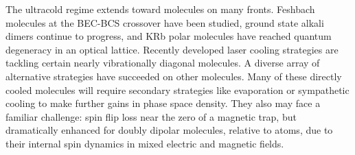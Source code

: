 \documentclass[%
 reprint,
 amsmath,amssymb,
 aps,
prl,
]{revtex4-1}
\newcommand{\s}{{\nobreak\hspace{.2em}}}
\begin{document}
The ultracold regime extends toward molecules on many fronts\s\cite{Carr2009}.
Feshbach molecules at the BEC-BCS crossover have been studied\s\cite{Greiner2003, Zwierlein2003, Jochim2003}, ground state alkali dimers continue to progress\s\cite{Ni2008, Danzl2010, Takekoshi2014, Molony2014, Park2015, Guo2016, Drews2017, Liu2017, Rvachov2017},
and KRb polar molecules have reached quantum degeneracy in an optical lattice\s\cite{Moses2015}.
Recently developed laser cooling strategies are tackling certain nearly vibrationally diagonal molecules\s\cite{Stuhl2008, Hummon2013, Barry2014, Zhelyazkova2014, Hemmerling2016, Truppe2017}.
A diverse array of alternative strategies have succeeded on other molecules\s\cite{Weinstein1998, Bethlem1999, Bochinski2003, Narevicius2008, Sawyer2011, Wiederkehr2012, Prehn2016, Liu2017a, Wu2017}.
Many of these directly cooled molecules will require secondary strategies like evaporation or sympathetic cooling to make further gains in phase space density\s\cite{Parazzoli2011, Stuhl2012evap, Quemener2016}.
They also may face a familiar challenge: spin flip loss near the zero of a magnetic trap, but dramatically enhanced for doubly dipolar molecules, relative to atoms, due to their internal spin dynamics in mixed electric and magnetic fields.
\end{document}

